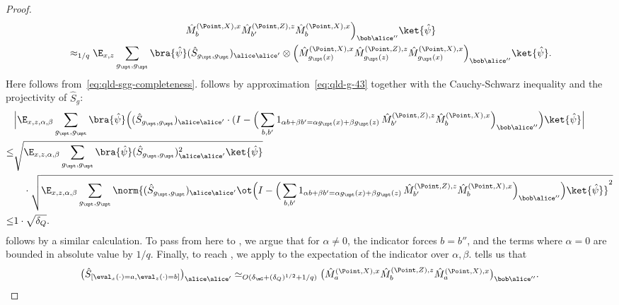 \begin{proof}
\begin{align}
    &\hspace{12em}\hat{M}^{(\Point, X), x}_{b} \hat{M}^{(\Point,Z),z}_{b'} \hat{M}^{(\Point,X),x}_{b} \Big)_{\bob \alice''} \ket{\hat{\psi}} \label{eq:qld-s-mmm-positive} \\
		&\approx_{ 1/q}\E_{x,z}  \sum_{g_\xpt, g_\zpt} \bra{\hat{\psi}} (\hat{S}_{g_\xpt,g_\zpt})_{\alice \alice'} \otimes \Big ( \hat{M}^{(\Point, X), x}_{g_\xpt(x)} \hat{M}^{(\Point,Z),z}_{g_\zpt(z)} \hat{M}^{(\Point,X),x}_{g_\xpt(x)} \Big)_{\bob \alice''} \ket{\hat{\psi}}. \label{eq:qld-xzx-disagree}
	\end{align}
	Here  follows from~\eqref{eq:qld-sgg-completeness}.  follows by approximation~\eqref{eq:qld-g-43} together with the Cauchy-Schwarz inequality and the projectivity of $\hat{S}_g$:
        \begin{align*}
          &\Big| \E_{x,z,\alpha,\beta} \sum_{g_\xpt, g_\zpt} \bra{\hat{\psi}} \Big( (\hat{S}_{g_\xpt, g_\zpt})_{\alice \alice'} \cdot (I -  \Big( \sum_{b,b'} 1_{\alpha b + \beta b' = \alpha g_\xpt (x) + \beta g_\zpt(z)} \, \hat{M}^{(\Point,Z),z}_{b'} \hat{M}^{(\Point,X),x}_{b} \Big)_{\bob \alice''}\Big) \ket{\hat{\psi}} \Big| \\
          \leq& \sqrt{\E_{x,z,\alpha,\beta} \sum_{g_\xpt, g_\zpt} \bra{\hat{\psi}} (\hat{S}_{g_\xpt, g_\zpt})_{\alice \alice'}^2 \ket{\hat{\psi}}} \\
          &\quad \cdot \sqrt{\E_{x,z,\alpha,\beta} \sum_{g_\xpt, g_\zpt} \norm{ (\hat{S}_{g_\xpt, g_\zpt})_{\alice \alice'} \ot 
\Big(I - \Big( \sum_{b,b'} 1_{\alpha b + \beta b' = \alpha g_\xpt(x) + \beta g_\zpt(z)} \, \hat{M}^{(\Point, Z),z}_{b'} \hat{M}^{(\Point, X), x}_{b} \Big)_{\bob \alice''} \Big)\ket{\hat{\psi}} }^2 } \\
          \leq& 1 \cdot \sqrt{\delta_Q}.
        \end{align*}
         follows by a similar calculation. To pass from here to , we argue that for $\alpha \neq 0$, the indicator forces $b = b''$, and the terms where $\alpha = 0$ are bounded in absolute value by $1/q$. Finally, to reach , we apply  to the expectation of the indicator over $\alpha, \beta$.  tells us that
        \begin{equation} \big(\hat{S}_{[\eval_{x}(\cdot) = a, \eval_{z}(\cdot) = b]}\big)_{\alice \alice'} \simeq_{O(\delta_{\mG} + (\delta_Q)^{1/2} + 1/q)} \big( \hat{M}^{(\Point, X), x}_{a} \hat{M}^{(\Point, Z), z}_{b} \hat{M}^{(\Point, X), x}_{a}\big)_{\bob \alice''}. \label{eq:qld-sgg-mhat-sandwich} \end{equation}


\end{proof}
